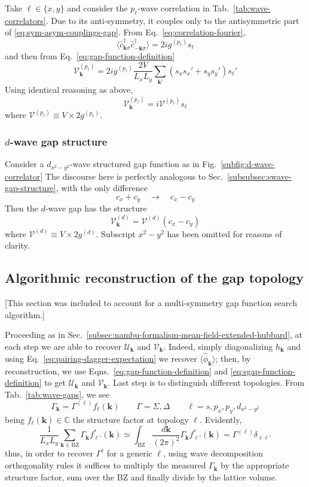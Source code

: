 Take $\ell \in \lbrace x,y \rbrace$ and consider the $p_\ell$-wave correlation in Tab.~\ref{tab:wave-correlators}. Due to its anti-symmetry, it couples only to the antisymmetric part of \eqref{eq:sym-asym-couplings-gap}. From Eq.~\eqref{eq:correlation-fourier},
\[
	\langle 
		\hat c_{\mathbf{k}\sigma}^\dagger \hat c_{-\mathbf{k} \overline{\sigma}}^\dagger
	\rangle = 2i g^{(p_\ell)} s_\ell
\]
and then from Eq.~\eqref{eq:gap-function-definition}
\[
	\mathcal{V}_\mathbf{k}^{(p_\ell)} = 2i g^{(p_\ell)} \frac{2V}{L_xL_y}\sum_{\mathbf{k}'} (s_x s_x' + s_y s_y') s_\ell'
\]
Using identical reasoning as above,
\[
	\mathcal{V}_\mathbf{k}^{(p_\ell)} = i \mathcal{V}^{(p_\ell)} s_\ell
\]
where $\mathcal{V}^{(p_\ell)} \equiv V \times 2 g^{(p_\ell)}$.

\subsubsection{$d$-wave gap structure}

Consider a $d_{x^2 - y^2}$-wave structured gap function as in Fig.~\ref{subfig:d-wave-correlator} The discourse here is perfectly analogous to Sec.~\ref{subsubsec:swave-gap-structure}, with the only difference
\[
	c_x + c_y
	\quad\to\quad
	c_x - c_y
\]
Then the $d$-wave gap has the structure
\begin{equation}\label{eq:dwave-gap}
	\mathcal{V}_\mathbf{k}^{(d)} = \mathcal{V}^{(d)} (c_x - c_y)
\end{equation}
where $\mathcal{V}^{(d)} \equiv V \times 2 g^{(d)}$. Subscript $x^2 - y^2$ has been omitted for reasons of clarity.

\subsection{Algorithmic reconstruction of the gap topology}

{\color{tabred}[This section was included to account for a multi-symmetry gap function search algorithm.]}

Proceeding as in Sec.~\ref{subsec:nambu-formalism-mean-field-extended-hubbard}, at each step we are able to recover $\mathcal{U}_\mathbf{k}$ and $\mathcal{V}_\mathbf{k}$. Indeed, simply diagonalizing $h_\mathbf{k}$ and using Eq.~\eqref{eq:pairing-dagger-expectation} we recover $\langle \hat \phi_\mathbf{k} \rangle$; then, by reconstruction, we use Eqns.~\eqref{eq:gap-function-definition} and \eqref{eq:sgap-function-definition} to get $\mathcal{U}_\mathbf{k}$ and $\mathcal{V}_\mathbf{k}$. Last step is to distinguish different topologies. From Tab.~\ref{tab:wave-gaps}, we see
\[
	\Gamma_\mathbf{k} = \Gamma^{(\ell)} f_\ell (\mathbf{k})
	\qquad
	\Gamma = \Sigma, \Delta
	\qquad
	\ell = s,p_x,p_y,d_{x^2-y^2}
\]
being $f_\ell(\mathbf{k}) \in \mathbb{C}$ the structure factor at topology $\ell$. Evidently,
\[
	\frac{1}{L_x L_y} \sum_{\mathbf{k} \in \mathrm{BZ}} \Gamma_\mathbf{k} f_{\ell'}^* (\mathbf{k}) \simeq \int_\mathrm{BZ} \frac{d\mathbf{k}}{(2\pi)^2} \Gamma_\mathbf{k} f_{\ell'}^* (\mathbf{k}) = \Gamma^{(\ell)} \delta_{\ell\ell'}
\]
thus, in order to recover $\Gamma^{\ell}$ for a generic $\ell$, using wave decomposition orthogonality rules it suffices to multiply the measured $\Gamma_\mathbf{k}$ by the appropriate structure factor, sum over the BZ and finally divide by the lattice volume.